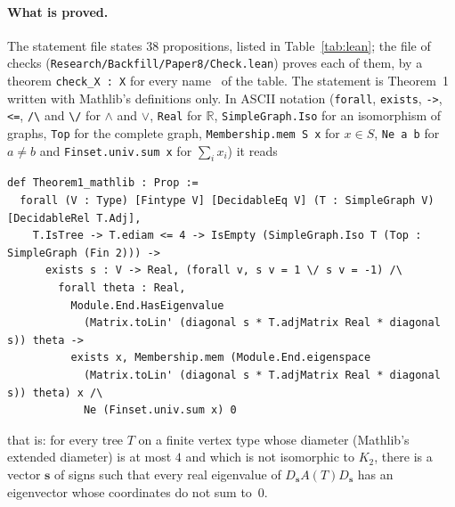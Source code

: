 \documentclass[11pt]{article}
\numberwithin{equation}{section}
\theoremstyle{remark}
\newcommand{\s}{\mathbf s}
\begin{document}
\paragraph{What is proved.}
The statement file states $38$ propositions, listed in Table~\ref{tab:lean};
the file of checks (\texttt{Research/Backfill/Paper8/Check.lean}) proves each
of them, by a theorem \texttt{check\_X : X} for every name~ of the
table. The statement  is Theorem~1 written with
Mathlib's definitions only. In ASCII notation (\verb|forall|,
\verb|exists|, \verb|->|, \verb|<=|, \verb|/\| and \verb|\/| for $\wedge$ and
$\vee$, \verb|Real| for $\mathbb R$,
\verb|SimpleGraph.Iso| for an isomorphism of graphs, \verb|Top| for the
complete graph, \verb|Membership.mem S x| for $x\in S$, \verb|Ne a b| for
$a\ne b$ and \verb|Finset.univ.sum x| for $\sum_ix_i$) it reads
\begin{footnotesize}
\begin{verbatim}
def Theorem1_mathlib : Prop :=
  forall (V : Type) [Fintype V] [DecidableEq V] (T : SimpleGraph V) [DecidableRel T.Adj],
    T.IsTree -> T.ediam <= 4 -> IsEmpty (SimpleGraph.Iso T (Top : SimpleGraph (Fin 2))) ->
      exists s : V -> Real, (forall v, s v = 1 \/ s v = -1) /\
        forall theta : Real,
          Module.End.HasEigenvalue
            (Matrix.toLin' (diagonal s * T.adjMatrix Real * diagonal s)) theta ->
          exists x, Membership.mem (Module.End.eigenspace
            (Matrix.toLin' (diagonal s * T.adjMatrix Real * diagonal s)) theta) x /\
            Ne (Finset.univ.sum x) 0
\end{verbatim}
\end{footnotesize}
that is: for every tree $T$ on a finite vertex type whose diameter (Mathlib's
extended diameter) is at most $4$ and which is not isomorphic to $K_2$, there
is a vector $\s$ of signs such that every real eigenvalue of
$D_{\s}A(T)D_{\s}$ has an eigenvector whose coordinates do not sum to~$0$.
\end{document}
